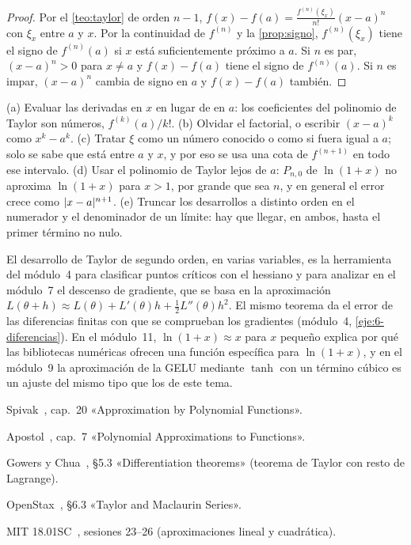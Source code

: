 \begin{proof}
Por el \cref{teo:taylor} de orden $n-1$, $f(x)-f(a)=\frac{f^{(n)}(\xi_x)}{n!}(x-a)^{n}$ con $\xi_x$ entre $a$ y $x$. Por la continuidad de $f^{(n)}$ y la \cref{prop:signo}, $f^{(n)}(\xi_x)$ tiene el signo de $f^{(n)}(a)$ si $x$ está suficientemente próximo a $a$. Si $n$ es par, $(x-a)^{n}>0$ para $x\ne a$ y $f(x)-f(a)$ tiene el signo de $f^{(n)}(a)$. Si $n$ es impar, $(x-a)^{n}$ cambia de signo en $a$ y $f(x)-f(a)$ también.
\end{proof}

\begin{observacion}\label{obs:6-errores}
(a) Evaluar las derivadas en $x$ en lugar de en $a$: los coeficientes del polinomio de Taylor son números, $f^{(k)}(a)/k!$.
(b) Olvidar el factorial, o escribir $(x-a)^{k}$ como $x^{k}-a^{k}$.
(c) Tratar $\xi$ como un número conocido o como si fuera igual a $a$; solo se sabe que está entre $a$ y $x$, y por eso se usa una cota de $f^{(n+1)}$ en todo ese intervalo.
(d) Usar el polinomio de Taylor lejos de $a$: $P_{n,0}$ de $\ln(1+x)$ no aproxima $\ln(1+x)$ para $x>1$, por grande que sea $n$, y en general el error crece como $\lvert x-a\rvert^{n+1}$.
(e) Truncar los desarrollos a distinto orden en el numerador y el denominador de un límite: hay que llegar, en ambos, hasta el primer término no nulo.
\end{observacion}

\begin{observacion}
El desarrollo de Taylor de segundo orden, en varias variables, es la herramienta del módulo~4 para clasificar puntos críticos con el hessiano y para analizar en el módulo~7 el descenso de gradiente, que se basa en la aproximación $L(\theta+h)\approx L(\theta)+L'(\theta)h+\tfrac12L''(\theta)h^{2}$. El mismo teorema da el error de las diferencias finitas con que se comprueban los gradientes (módulo~4, \cref{eje:6-diferencias}). En el módulo~11, $\ln(1+x)\approx x$ para $x$ pequeño explica por qué las bibliotecas numéricas ofrecen una función específica para $\ln(1+x)$, y en el módulo~9 la aproximación de la GELU mediante $\tanh$ con un término cúbico es un ajuste del mismo tipo que los de este tema.
\end{observacion}

\begin{lecturas}
\item Spivak~\cite{spivak}, cap.~20 «Approximation by Polynomial Functions».
\item Apostol~\cite{apostol}, cap.~7 «Polynomial Approximations to Functions».
\item Gowers y Chua~\cite{cambA1}, §5.3 «Differentiation theorems» (teorema de Taylor con resto de Lagrange).
\item OpenStax~\cite{osc2}, §6.3 «Taylor and Maclaurin Series».
\item MIT 18.01SC~\cite{mit1801}, sesiones 23--26 (aproximaciones lineal y cuadrática).
\end{lecturas}

